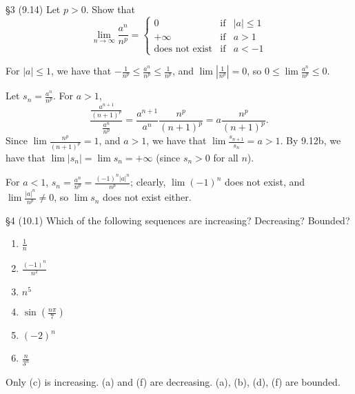 \documentclass{homework}
\begin{document}
\begin{problem}{\S 3}
  (9.14) Let $p>0$. Show that \[
    \lim\limits_{n \to \infty} \frac{a^{n}}{n^{p}}=\left\{\begin{array}{rcl}  
        0 & \mbox{if} & \left| a \right| \le 1\\
        +\infty & \mbox{if} & a > 1\\
        \text{does not exist} & \mbox{if} & a<-1
      \end{array}\right.
    \] 
\end{problem}

\begin{solution}
  For $\left| a \right| \le 1$, we have that $-\frac{1}{n^{p}}\le \frac{a^{n}}{n^{p}}\le
  \frac{1}{n^{p}}$, and $\lim{\left| \frac{1}{n^{p}} \right| }=0$, so $0\le
  \lim{\frac{a^{n}}{n^{p}}}\le 0$.

  Let $s_n=\frac{a^n}{n^p}$. For $a>1$, \[
    \frac{\frac{a^{n+1}}{(n+1)^{p}}}{\frac{a^n}{n^p}}=\frac{a^{n+1}}{a^{n}}\frac{n^{p}}{(n+1)^{p}}=a
    \frac{n^{p}}{(n+1)^{p}}
  .\] Since $\lim{\frac{n^p}{(n+1)^p}}=1$, and $a>1$, we have that $\lim{\frac{s_{n+1}}{s_n}}=a>1$.
  By 9.12b, we have that $\lim{\left| s_n \right| }=\lim{s_n}=+\infty$ (since $s_n>0$ for all $n$).

  For $a<1$, $s_n=\frac{a^n}{n^p}=\frac{(-1)^n\left| a \right| ^n}{n^p}$; clearly, $\lim{(-1)^n}$
  does not exist, and $\lim{\frac{\left| a \right| ^{n}}{n^p}}\neq 0$, so $\lim{s_n}$ does not exist either.
\end{solution}

\begin{problem}{\S 4}
  (10.1) Which of the following sequences are increasing? Decreasing? Bounded?
  \begin{enumerate}[label=(\alph*)]
    \item $\frac{1}{n}$ 
    \item $\frac{(-1)^n}{n^2}$
    \item $n^{5}$
    \item $\sin{(\frac{n\pi}{7})}$ 
    \item $(-2)^{n}$
    \item $\frac{n}{3^{n}}$
  \end{enumerate}
\end{problem}

\begin{solution}
  Only (c) is increasing. (a) and (f) are decreasing. (a), (b), (d), (f) are bounded.
\end{solution}
\end{document}
